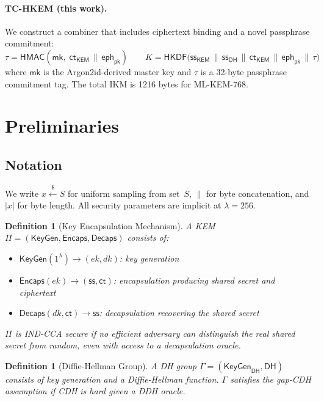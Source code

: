 \documentclass[11pt,a4paper]{article}
\newtheorem{definition}[theorem]{Definition}
\newcommand{\KEM}{\mathsf{KEM}}
\renewcommand{\DH}{\mathsf{DH}}
\newcommand{\HKDF}{\mathsf{HKDF}}
\newcommand{\HMAC}{\mathsf{HMAC}}
\newcommand{\Encaps}{\mathsf{Encaps}}
\newcommand{\Decaps}{\mathsf{Decaps}}
\newcommand{\KeyGen}{\mathsf{KeyGen}}
\newcommand{\mk}{\mathsf{mk}}
\newcommand{\ct}{\mathsf{ct}}
\newcommand{\eph}{\mathsf{eph}}
\begin{document}
\paragraph{TC-HKEM (this work).}
We construct a combiner that includes ciphertext binding and a
novel passphrase commitment:
\begin{equation}\label{eq:v7}
\boxed{
\tau = \HMAC(\mk,\; \ct_{\KEM} \,\|\, \eph_{\mathsf{pk}})
\qquad
K = \HKDF\bigl(\mathsf{ss}_{\KEM} \,\|\, \mathsf{ss}_{\DH} \,\|\,
\ct_{\KEM} \,\|\, \eph_{\mathsf{pk}} \,\|\, \tau\bigr)
}
\end{equation}
where $\mk$ is the Argon2id-derived master key and $\tau$ is a 32-byte
passphrase commitment tag. The total IKM is 1216 bytes for ML-KEM-768.

\section{Preliminaries}\label{sec:prelim}

\subsection{Notation}

We write $x \xleftarrow{\$} S$ for uniform sampling from set~$S$,
$\|$ for byte concatenation, and $|x|$ for byte length. All
security parameters are implicit at $\lambda = 256$.

\begin{definition}[Key Encapsulation Mechanism]
A KEM $\Pi = (\KeyGen, \Encaps, \Decaps)$ consists of:
\begin{itemize}[nosep]
\item $\KeyGen(1^\lambda) \to (ek, dk)$: key generation
\item $\Encaps(ek) \to (\mathsf{ss}, \ct)$: encapsulation producing shared secret and ciphertext
\item $\Decaps(dk, \ct) \to \mathsf{ss}$: decapsulation recovering the shared secret
\end{itemize}
$\Pi$ is \emph{IND-CCA secure} if no efficient adversary can distinguish the
real shared secret from random, even with access to a decapsulation oracle.
\end{definition}

\begin{definition}[Diffie-Hellman Group]
A DH group $\Gamma = (\KeyGen_{\DH}, \DH)$ consists of key generation
and a Diffie-Hellman function. $\Gamma$ satisfies the \emph{gap-CDH}
assumption if CDH is hard given a DDH oracle.
\end{definition}
\end{document}
